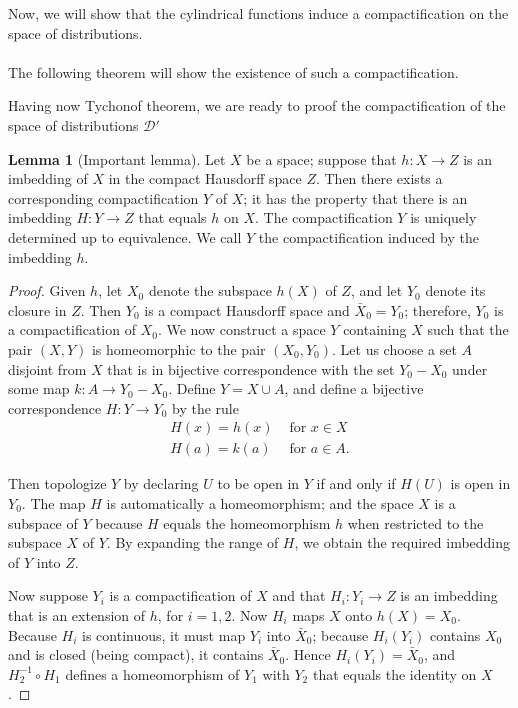 \documentclass{article}
\theoremstyle{definition}
\newtheorem{lemma}{Lemma}
\begin{document}
Now, we will show that the cylindrical functions induce a compactification on the space of distributions. \\\\
The following theorem will show the existence of such a compactification.

Having now Tychonof theorem, we are ready to proof the compactification of the space of distributions $\mathcal{D'}$







\begin{lemma}[Important lemma] Let $X$ be a space; suppose that $h: X \rightarrow Z$ is an imbedding of $X$ in the compact Hausdorff space $Z$. Then there exists a corresponding compactification $Y$ of $X$; it has the property that there is an imbedding $H: Y \rightarrow Z$ that equals $h$ on $X$. The compactification $Y$ is uniquely determined up to equivalence.
We call $Y$ the compactification induced by the imbedding $h$.
\end{lemma}
\begin{proof} Given $h$, let $X_0$ denote the subspace $h(X)$ of $Z$, and let $Y_0$ denote its closure in $Z$. Then $Y_0$ is a compact Hausdorff space and $\bar{X}_0=Y_0$; therefore, $Y_0$ is a compactification of $X_0$.
We now construct a space $Y$ containing $X$ such that the pair $(X, Y)$ is homeomorphic to the pair $\left(X_0, Y_0\right)$. Let us choose a set $A$ disjoint from $X$ that is in bijective correspondence with the set $Y_0-X_0$ under some map $k: A \rightarrow Y_0-X_0$. Define $Y=X \cup A$, and define a bijective correspondence $H: Y \rightarrow Y_0$ by the rule
$$
\begin{array}{ll}
H(x)=h(x) & \text { for } x \in X \\
H(a)=k(a) & \text { for } a \in A .
\end{array}
$$

Then topologize $Y$ by declaring $U$ to be open in $Y$ if and only if $H(U)$ is open in $Y_0$. The map $H$ is automatically a homeomorphism; and the space $X$ is a subspace of $Y$ because $H$ equals the homeomorphism $h$ when restricted to the subspace $X$ of $Y$. By expanding the range of $H$, we obtain the required imbedding of $Y$ into $Z$.

Now suppose $Y_i$ is a compactification of $X$ and that $H_i: Y_i \rightarrow Z$ is an imbedding that is an extension of $h$, for $i=1,2$. Now $H_i$ maps $X$ onto $h(X)=X_0$. Because $H_i$ is continuous, it must map $Y_i$ into $\bar{X}_0$; because $H_i\left(Y_i\right)$ contains $X_0$ and is closed (being compact), it contains $\bar{X}_0$. Hence $H_i\left(Y_i\right)=\bar{X}_0$, and $H_2^{-1} \circ H_1$ defines a homeomorphism of $Y_1$ with $Y_2$ that equals the identity on $X$.
\end{proof}
\end{document}
